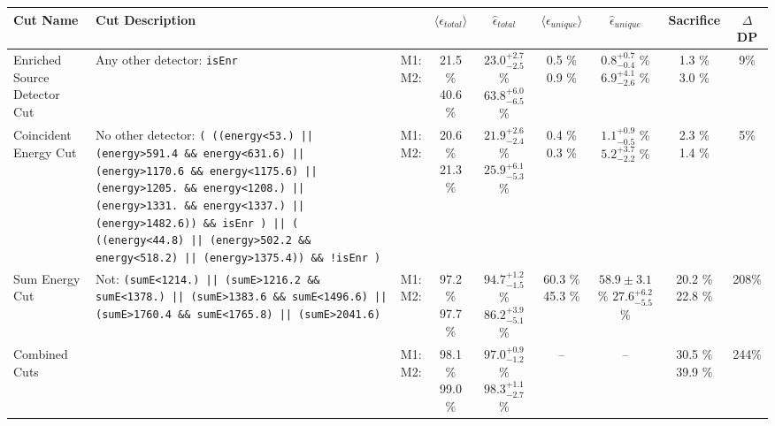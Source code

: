 \small
\begin{tabular}{|>{\raggedright}m{3cm}|m{6cm}|c c c|c c|c|c|}
\hline
  Cut Name & Cut Description &   & $\langle\epsilon_{total}\rangle$ & $\hat{\epsilon}_{total}$ & $\langle\epsilon_{unique}\rangle$ & $\hat{\epsilon}_{unique}$ & Sacrifice & $\Delta$DP \\
\hline
  Enriched Source Detector Cut & \tiny Any other detector: \texttt{isEnr} & \makecell{M1: \\ M2:} & \makecell{21.5 \% \\ 40.6 \%} & \makecell{$23.0^{+2.7}_{-2.5}$ \% \\ $63.8^{+6.0}_{-6.5}$ \%} & \makecell{0.5 \% \\ 0.9 \%} & \makecell{$0.8^{+0.7}_{-0.4}$ \% \\ $6.9^{+4.1}_{-2.6}$ \%} & \makecell{1.3 \% \\ 3.0 \%} & 9\% \\
  Coincident Energy Cut & \tiny No other detector: \texttt{( ((energy<53.) || (energy>591.4 \&\& energy<631.6) || (energy>1170.6 \&\& energy<1175.6) || (energy>1205. \&\& energy<1208.) || (energy>1331. \&\& energy<1337.) || (energy>1482.6)) \&\& isEnr ) || ( ((energy<44.8) || (energy>502.2 \&\& energy<518.2) || (energy>1375.4)) \&\& !isEnr )} & \makecell{M1: \\ M2:} & \makecell{20.6 \% \\ 21.3 \%} & \makecell{$21.9^{+2.6}_{-2.4}$ \% \\ $25.9^{+6.1}_{-5.3}$ \%} & \makecell{0.4 \% \\ 0.3 \%} & \makecell{$1.1^{+0.9}_{-0.5}$ \% \\ $5.2^{+3.7}_{-2.2}$ \%} & \makecell{2.3 \% \\ 1.4 \%} & 5\% \\
  Sum Energy Cut & \tiny Not:  \texttt{(sumE<1214.) || (sumE>1216.2 \&\& sumE<1378.) || (sumE>1383.6 \&\& sumE<1496.6) || (sumE>1760.4 \&\& sumE<1765.8) || (sumE>2041.6)} & \makecell{M1: \\ M2:} & \makecell{97.2 \% \\ 97.7 \%} & \makecell{$94.7^{+1.2}_{-1.5}$ \% \\ $86.2^{+3.9}_{-5.1}$ \%} & \makecell{60.3 \% \\ 45.3 \%} & \makecell{$58.9 \pm 3.1$ \% \\ $27.6^{+6.2}_{-5.5}$ \%} & \makecell{20.2 \% \\ 22.8 \%} & 208\% \\
  Combined Cuts &  & \makecell{M1: \\ M2:} & \makecell{98.1 \% \\ 99.0 \%} & \makecell{$97.0^{+0.9}_{-1.2}$ \% \\ $98.3^{+1.1}_{-2.7}$ \%} & -- & -- & \makecell{30.5 \% \\ 39.9 \%} & 244\% \\
\hline
\end{tabular}
